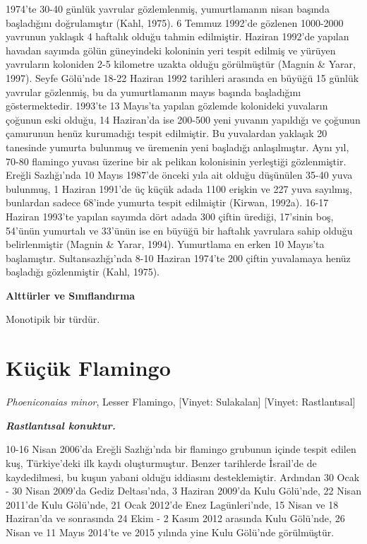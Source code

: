 \documentclass[
  a4paper,
  DIV=11,
  numbers=noendperiod]{scrreprt}
\begin{document}
1974'te 30-40 günlük yavrular gözlemlenmiş, yumurtlamanın nisan başında
başladığını doğrulamıştır (Kahl, 1975). 6 Temmuz 1992'de gözlenen
1000-2000 yavrunun yaklaşık 4 haftalık olduğu tahmin edilmiştir. Haziran
1992'de yapılan havadan sayımda gölün güneyindeki koloninin yeri tespit
edilmiş ve yürüyen yavruların koloniden 2-5 kilometre uzakta olduğu
görülmüştür (Magnin \& Yarar, 1997). Seyfe Gölü'nde 18-22 Haziran 1992
tarihleri arasında en büyüğü 15 günlük yavrular gözlenmiş, bu da
yumurtlamanın mayıs başında başladığını göstermektedir. 1993'te 13
Mayıs'ta yapılan gözlemde kolonideki yuvaların çoğunun eski olduğu, 14
Haziran'da ise 200-500 yeni yuvanın yapıldığı ve çoğunun çamurunun henüz
kurumadığı tespit edilmiştir. Bu yuvalardan yaklaşık 20 tanesinde
yumurta bulunmuş ve üremenin yeni başladığı anlaşılmıştır. Aynı yıl,
70-80 flamingo yuvası üzerine bir ak pelikan kolonisinin yerleştiği
gözlenmiştir. Ereğli Sazlığı'nda 10 Mayıs 1987'de önceki yıla ait olduğu
düşünülen 35-40 yuva bulunmuş, 1 Haziran 1991'de üç küçük adada 1100
erişkin ve 227 yuva sayılmış, bunlardan sadece 68'inde yumurta tespit
edilmiştir (Kirwan, 1992a). 16-17 Haziran 1993'te yapılan sayımda dört
adada 300 çiftin ürediği, 17'sinin boş, 54'ünün yumurtalı ve 33'ünün ise
en büyüğü bir haftalık yavrulara sahip olduğu belirlenmiştir (Magnin \&
Yarar, 1994). Yumurtlama en erken 10 Mayıs'ta başlamıştır.
Sultansazlığı'nda 8-10 Haziran 1974'te 200 çiftin yuvalamaya henüz
başladığı gözlenmiştir (Kahl, 1975).

\textbf{Alttürler ve Sınıflandırma}

Monotipik bir türdür.

\section{Küçük Flamingo}\label{kuxfcuxe7uxfck-flamingo}

\emph{Phoeniconaias minor}, Lesser Flamingo, {[}Vinyet: Sulakalan{]}
{[}Vinyet: Rastlantısal{]}

\textbf{\emph{Rastlantısal konuktur.}}

10-16 Nisan 2006'da Ereğli Sazlığı'nda bir flamingo grubunun içinde
tespit edilen kuş, Türkiye'deki ilk kaydı oluşturmuştur. Benzer
tarihlerde İsrail'de de kaydedilmesi, bu kuşun yabani olduğu iddiasını
desteklemiştir. Ardından 30 Ocak - 30 Nisan 2009'da Gediz Deltası'nda, 3
Haziran 2009'da Kulu Gölü'nde, 22 Nisan 2011'de Kulu Gölü'nde, 21 Ocak
2012'de Enez Lagünleri'nde, 15 Nisan ve 18 Haziran'da ve sonrasında 24
Ekim - 2 Kasım 2012 arasında Kulu Gölü'nde, 26 Nisan ve 11 Mayıs 2014'te
ve 2015 yılında yine Kulu Gölü'nde görülmüştür.
\end{document}
